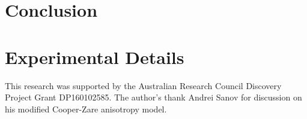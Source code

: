\documentclass[journal=jacsat,manuscript=article,layout=onecolumn]{achemso}
\begin{document}
\section{Conclusion}

\section{Experimental Details}


\begin{acknowledgement}
	This research was supported by the Australian Research Council Discovery
	Project Grant DP160102585. The author's thank Andrei Sanov for discussion on his modified Cooper-Zare anisotropy model.
\end{acknowledgement}




\end{document}
